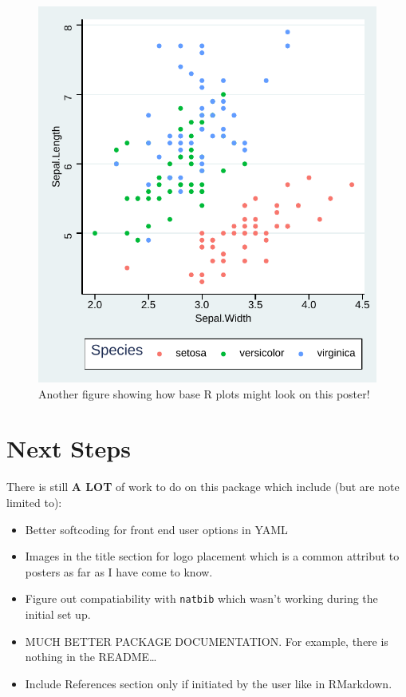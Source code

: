 \documentclass[article,30pt,extrafontsizes]{memoir}
\begin{document}
\begin{adjmulticols*}{3}{10mm}{10mm}
{\begin{figure}
{\centering \includegraphics[width=0.8\linewidth]{skeleton_files/figure-latex/unnamed-chunk-6-1} 

}

\caption{Another figure showing how base R plots might look on this poster!}\label{fig:unnamed-chunk-6}
\end{figure}

\section{Next Steps}\label{next-steps}

There is still \textbf{A LOT} of work to do on this package which
include (but are note limited to):

\begin{itemize}
\tightlist
\item
  Better softcoding for front end user options in YAML
\item
  Images in the title section for logo placement which is a common
  attribut to posters as far as I have come to know.
\item
  Figure out compatiability with \texttt{natbib} which wasn't working
  during the initial set up.
\item
  MUCH BETTER PACKAGE DOCUMENTATION. For example, there is nothing in
  the README\ldots{}
\item
  Include References section only if initiated by the user like in
  RMarkdown.
\end{itemize}

\small
\printbibliography
}
\end{adjmulticols*}
\end{document}
